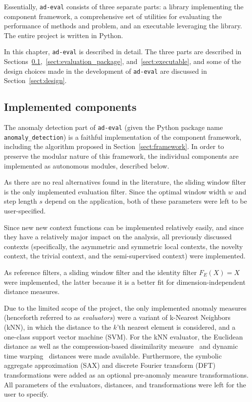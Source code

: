 Essentially, \texttt{ad-eval} consists of three separate parts: a library implementing the component framework, a comprehensive set of utilities for evaluating the performance of methods and problem, and an executable leveraging the library. The entire project is written in Python.

In this chapter, \texttt{ad-eval} is described in detail. The three parts are described in Sections~\ref{sect:implemented_problems},~\ref{sect:evaluation_package}, and~\ref{sect:executable}, and some of the design choices made in the development of \texttt{ad-eval} are discussed in Section~\ref{sect:design}.

\subsection{Implemented components}
\label{sect:implemented_problems}

The anomaly detection part of \texttt{ad-eval} (given the Python package name \texttt{anomaly\_detection}) is a faithful implementation of the component framework, including the algorithm proposed in Section~\ref{sect:framework}. In order to preserve the modular nature of this framework, the individual components are implemented as autonomous modules, described below.

As there are no real alternatives found in the literature, the sliding window filter is the only implemented evaluation filter. Since the optimal window width $w$ and step length $s$ depend on the application, both of these parameters were left to be user-specified.

Since new new context functions can be implemented relatively easily, and since they have a relatively major impact on the analysis, all previously discussed contexts (specifically, the asymmetric and symmetric local contexts, the novelty context, the trivial context, and the semi-supervised context) were implemented.

As reference filters, a sliding window filter and the identity filter $F_E(X)=X$ were implemented, the latter because it is a better fit for dimension-independent distance measures.

Due to the limited scope of the project, the only implemented anomaly measures (henceforth referred to as \emph{evaluators}) were a variant of k-Nearest Neighbors (kNN), in which the distance to the $k$'th nearest element is considered, and a one-class support vector machine (SVM). For the kNN evaluator, the Euclidean distance as well as the compression-based dissimilarity measure~\cite{keogh2} and dynamic time warping~\cite{dtw} distances were made available. Furthermore, the symbolic aggregate approximation (SAX) and discrete Fourier transform (DFT) transformations were added as an optional pre-anomaly measure transformations. All parameters of the evaluators, distances, and transformations were left for the user to specify.

